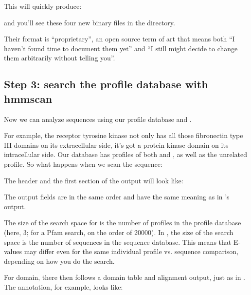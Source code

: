   \vspace{1ex}
   \vspace{1ex}

This will quickly produce:


and you'll see these four new binary files in the directory. 

Their format is ``proprietary'', an open source term of art that means
both ``I haven't found time to document them yet'' and ``I still might
decide to change them arbitrarily without telling you''.

\subsection{Step 3: search the profile database with hmmscan}

Now we can analyze sequences using our profile database and
. 

For example, the receptor tyrosine kinase  not only
has all those fibronectin type III domains on its extracellular side,
it's got a protein kinase domain on its intracellular side. Our
 database has profiles of both  and
, as well as the unrelated  profile. So
what happens when we scan the  sequence:

   \vspace{1ex}
   \vspace{1ex}

The header and the first section of the output will look like:


The output fields are in the same order and have the same meaning as
in 's output. 

The size of the search space for  is the number of
profiles in the profile database (here, 3; for a Pfam search, on the order
of 20000). In , the size of the search space is the
number of sequences in the sequence database. This means that E-values
may differ even for the same individual profile vs. sequence
comparison, depending on how you do the search.

For domain, there then follows a domain table and alignment output,
just as in . The  annotation, for example,
looks like:

